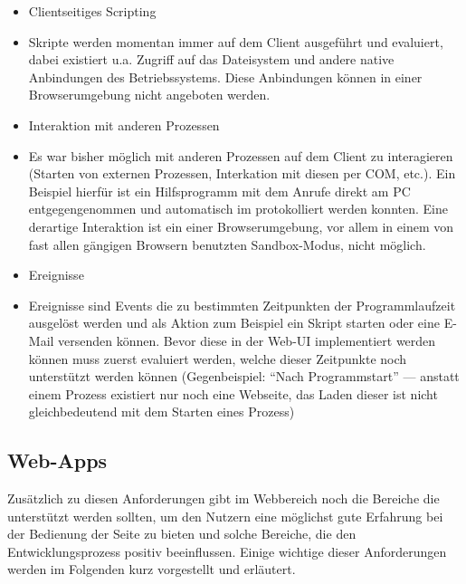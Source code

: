 \begin{itemize}
    \item{Clientseitiges Scripting}
    \item[] Skripte werden momentan immer auf dem Client ausgeführt und evaluiert, dabei existiert u.a. Zugriff auf das Dateisystem und andere native Anbindungen des Betriebssystems. Diese Anbindungen können in einer Browserumgebung nicht angeboten werden. 
    \item{Interaktion mit anderen Prozessen}
    \item[] Es war bisher möglich mit anderen Prozessen auf dem Client zu interagieren (Starten von externen Prozessen, Interkation mit diesen per \gls{COM}, etc.). Ein Beispiel hierfür ist ein Hilfsprogramm mit dem Anrufe direkt am PC entgegengenommen und automatisch im  protokolliert werden konnten. Eine derartige Interaktion ist ein einer Browserumgebung, vor allem in einem von fast allen gängigen Browsern benutzten Sandbox-Modus, nicht möglich.
    \item{Ereignisse} 
    \item[] Ereignisse sind Events die zu bestimmten Zeitpunkten der Programmlaufzeit ausgelöst werden und als Aktion zum Beispiel ein Skript starten oder eine E-Mail versenden können. Bevor diese in der Web-UI implementiert werden können muss zuerst evaluiert werden, welche dieser Zeitpunkte noch unterstützt werden können (Gegenbeispiel: ``Nach Programmstart'' --- anstatt einem Prozess existiert nur noch eine Webseite, das Laden dieser ist nicht gleichbedeutend mit dem Starten eines Prozess)
\end{itemize}

\subsection{Web-Apps}
Zusätzlich zu diesen Anforderungen gibt im Webbereich noch die Bereiche die unterstützt werden sollten, um den Nutzern eine möglichst gute Erfahrung bei der Bedienung der Seite zu bieten und solche Bereiche, die den Entwicklungsprozess positiv beeinflussen. Einige wichtige dieser Anforderungen werden im Folgenden kurz vorgestellt und erläutert. 

